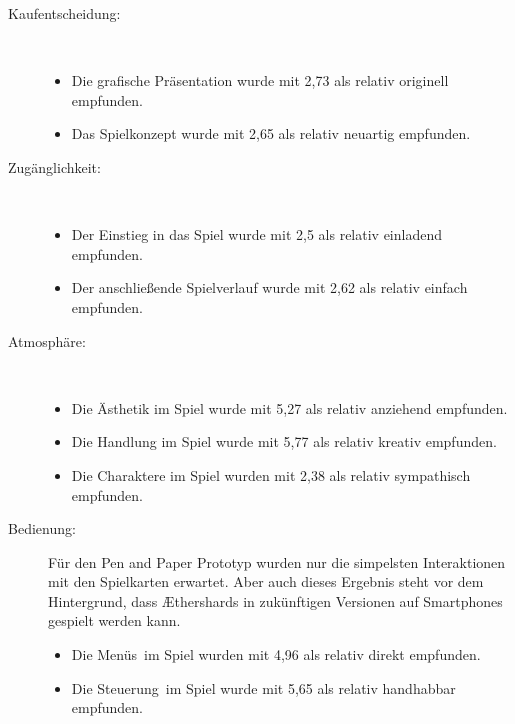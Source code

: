 \begin{description}
\item[Kaufentscheidung:]\
\begin{itemize}

\item Die grafische Präsentation wurde mit 2,73 als relativ originell empfunden. 

\item Das Spielkonzept wurde mit 2,65 als relativ neuartig empfunden. 


\end{itemize}
\item[Zugänglichkeit:] \ 
\begin{itemize}
\item Der Einstieg in das Spiel wurde mit 2,5 als relativ einladend empfunden.

\item Der anschließende Spielverlauf wurde mit 2,62 als relativ einfach empfunden.
\end{itemize}


\item[Atmosphäre:]\ 
\begin{itemize}

\item Die Ästhetik im Spiel wurde mit 5,27 als relativ anziehend empfunden.

\item Die Handlung im Spiel wurde mit 5,77 als relativ kreativ empfunden.


\item Die Charaktere im Spiel wurden mit 2,38 als relativ sympathisch empfunden.
\end{itemize}




\item[Bedienung:] Für den Pen and Paper Prototyp wurden nur die simpelsten Interaktionen mit den Spielkarten erwartet. Aber auch dieses Ergebnis steht vor dem Hintergrund, dass Æthershards in zukünftigen Versionen auf Smartphones gespielt werden kann.
\begin{itemize}



\item Die \glqq Menüs\grqq\ im Spiel wurden mit 4,96 als relativ direkt empfunden.


\item Die \glqq Steuerung\grqq\ im Spiel wurde mit 5,65 als relativ handhabbar empfunden.
\end{itemize}



\end{description}
